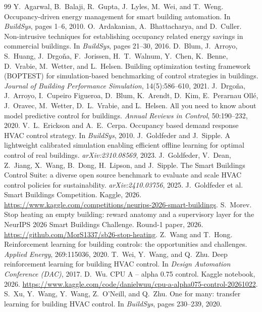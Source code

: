 \documentclass{article}
\begin{document}
\small
\begin{thebibliography}{99}
 Y.~Agarwal, B.~Balaji, R.~Gupta, J.~Lyles, M.~Wei, and T.~Weng. Occupancy-driven energy management for smart building automation. In \emph{BuildSys}, pages 1--6, 2010.
 O.~Ardakanian, A.~Bhattacharya, and D.~Culler. Non-intrusive techniques for establishing occupancy related energy savings in commercial buildings. In \emph{BuildSys}, pages 21--30, 2016.
 D.~Blum, J.~Arroyo, S.~Huang, J.~Drgo\v{n}a, F.~Jorissen, H.~T.~Walnum, Y.~Chen, K.~Benne, D.~Vrabie, M.~Wetter, and L.~Helsen. Building optimization testing framework ({BOPTEST}) for simulation-based benchmarking of control strategies in buildings. \emph{Journal of Building Performance Simulation}, 14(5):586--610, 2021.
 J.~Drgo\v{n}a, J.~Arroyo, I.~Cupeiro Figueroa, D.~Blum, K.~Arendt, D.~Kim, E.~Perarnau Oll\'e, J.~Oravec, M.~Wetter, D.~L.~Vrabie, and L.~Helsen. All you need to know about model predictive control for buildings. \emph{Annual Reviews in Control}, 50:190--232, 2020.
 V.~L.~Erickson and A.~E.~Cerpa. Occupancy based demand response {HVAC} control strategy. In \emph{BuildSys}, 2010.
 J.~Goldfeder and J.~Sipple. A lightweight calibrated simulation enabling efficient offline learning for optimal control of real buildings. \emph{arXiv:2310.08569}, 2023.
 J.~Goldfeder, V.~Dean, Z.~Jiang, X.~Wang, B.~Dong, H.~Lipson, and J.~Sipple. The Smart Buildings Control Suite: a diverse open source benchmark to evaluate and scale {HVAC} control policies for sustainability. \emph{arXiv:2410.03756}, 2025.
 J.~Goldfeder et al. Smart Buildings Competition. Kaggle, 2026. \url{https://www.kaggle.com/competitions/neurips-2026-smart-buildings}.
 S.~Morev. Stop heating an empty building: reward anatomy and a supervisory layer for the NeurIPS 2026 Smart Buildings Challenge. Round-1 paper, 2026. \url{https://github.com/MorS1337/sb26-stop-heating}.
 Z.~Wang and T.~Hong. Reinforcement learning for building controls: the opportunities and challenges. \emph{Applied Energy}, 269:115036, 2020.
 T.~Wei, Y.~Wang, and Q.~Zhu. Deep reinforcement learning for building {HVAC} control. In \emph{Design Automation Conference (DAC)}, 2017.
 D.~Wu. CPU A -- alpha 0.75 control. Kaggle notebook, 2026. \url{https://www.kaggle.com/code/danielwuu/cpu-a-alpha075-control-20261022}.
 S.~Xu, Y.~Wang, Y.~Wang, Z.~O'Neill, and Q.~Zhu. One for many: transfer learning for building {HVAC} control. In \emph{BuildSys}, pages 230--239, 2020.
\end{thebibliography}
\end{document}

